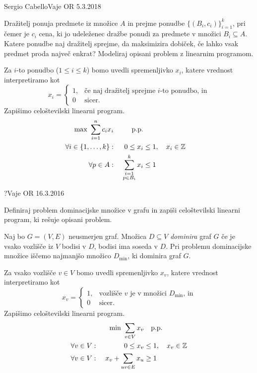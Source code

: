 \begin{naloga}%
{Sergio Cabello}{Vaje OR 5.3.2018}
\begin{vprasanje}
Dražitelj ponuja predmete iz množice $A$
in prejme ponudbe $\{(B_i, c_i)\}_{i=1}^k$,
pri čemer je $c_i$ cena,
ki jo udeleženec dražbe ponudi za predmete v množici $B_i \subseteq A$.
Katere ponudbe naj dražitelj sprejme,
da maksimizira dobiček,
če lahko vsak predmet proda največ enkrat?
Modeliraj opisani problem z linearnim programom.
\end{vprasanje}

\begin{odgovor}
Za $i$-to ponudbo ($1 \le i \le k$) bomo uvedli spremenljivko $x_i$,
katere vrednost interpretiramo kot
$$
x_i = \begin{cases}
1, & \text{če naj dražitelj sprejme $i$-to ponudbo, in} \\
0  & \text{sicer.}
\end{cases}
$$
Zapišimo celoštevilski linearni program.
\begin{alignat*}{2}
\max \ \sum_{i=1}^n c_i x_i && \text{p.p.} \\
\forall i \in \{1, \dots, k\}: &\ & 0 \le x_i &\le 1, \quad x_i \in \mathbb{Z} \\
\forall p \in A: &\ & \sum_{\substack{i=1 \\ p \in B_i}}^k x_i &\le 1
\end{alignat*}
\end{odgovor}
\end{naloga}


\begin{naloga}{?}{Vaje OR 16.3.2016}
\begin{vprasanje}
Definiraj problem dominacijske množice v grafu
in zapiši celoštevilski linearni program,
ki rešuje opisani problem.
\end{vprasanje}

\begin{odgovor}
Naj bo $G = (V, E)$ neusmerjen graf.
Množica $D \subseteq V$ {\em dominira} graf $G$
če je vsako vozlišče iz $V$ bodisi v $D$, bodisi ima soseda v $D$.
Pri problemu dominacijske množice iščemo najmanjšo množico $D_{\min}$,
ki dominira graf $G$.

Za vsako vozlišče $v \in V$ bomo uvedli spremenljivko $x_v$,
katere vrednost interpretiramo kot
$$
x_v = \begin{cases}
1, & \text{vozlišče $v$ je v množici $D_{\min}$, in} \\
0  & \text{sicer.}
\end{cases}
$$
Zapišimo celoštevilski linearni program.
\begin{alignat*}{2}
&& \min \ \sum_{v \in V} x_v &\quad \text{p.p.} \\
\forall v \in V: &\ & 0 \le x_v &\le 1, \quad x_v \in \mathbb{Z} \\
\forall v \in V: &\ & x_v + \sum_{uv \in E} x_u &\ge 1
\end{alignat*}
\end{odgovor}
\end{naloga}


